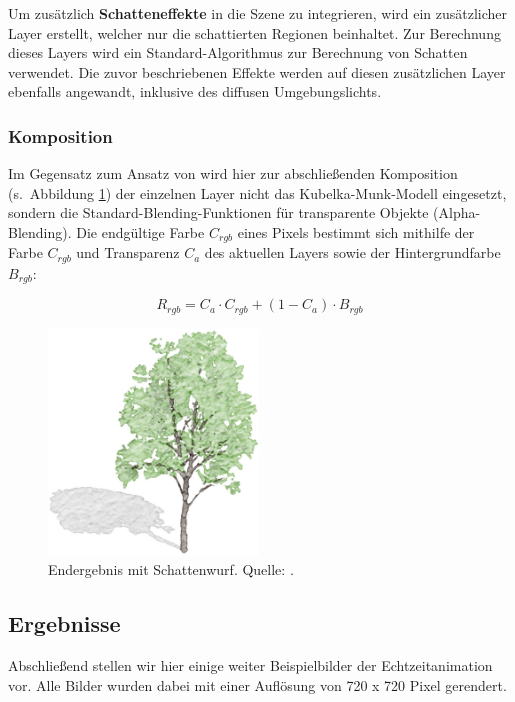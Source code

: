 Um zusätzlich \textbf{Schatteneffekte} in die Szene zu integrieren, wird ein
zusätzlicher Layer erstellt, welcher nur die schattierten Regionen beinhaltet.
Zur Berechnung dieses Layers wird ein Standard-Algorithmus zur Berechnung von
Schatten verwendet. Die zuvor beschriebenen Effekte werden auf diesen
zusätzlichen Layer ebenfalls angewandt, inklusive des diffusen Umgebungslichts.

\subsubsection{Komposition}
Im Gegensatz zum Ansatz von \cite{Curtis1997} wird hier zur abschließenden 
Komposition (s.\ Abbildung \ref{fig:tree-result}) der einzelnen Layer nicht das 
Kubelka-Munk-Modell eingesetzt, sondern die Standard-Blending-Funktionen für 
transparente Objekte (Alpha-Blending). Die endgültige Farbe $C_{rgb}$ eines 
Pixels bestimmt sich mithilfe der Farbe $C_{rgb}$ und Transparenz $C_a$ des 
aktuellen Layers sowie der Hintergrundfarbe $B_{rgb}$:

\[
R_{rgb} = C_a \cdot C_{rgb} + (1 - C_a) \cdot B_{rgb}
\]

\begin{figure}
  \centering
  \includegraphics[height=6cm]{../images/Luft2006-tree-result}
  \caption{Endergebnis mit Schattenwurf. Quelle: \cite{Luft2006}.}
  \label{fig:tree-result}
\end{figure}

\subsection{Ergebnisse}
Abschließend stellen wir hier einige weiter Beispielbilder der Echtzeitanimation
vor. Alle Bilder wurden dabei mit einer Auflösung von 720 x 720 Pixel gerendert.

